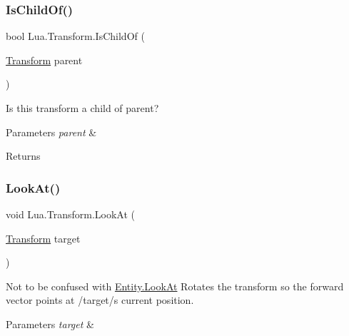 \subsubsection{\texorpdfstring{IsChildOf()}{IsChildOf()}}
{\footnotesize\ttfamily bool Lua.\+Transform.\+Is\+Child\+Of (\begin{DoxyParamCaption}\item[{\mbox{\hyperlink{class_lua_1_1_transform}{Transform}}}]{parent }\end{DoxyParamCaption})}



Is this transform a child of parent? 


\begin{DoxyParams}{Parameters}
{\em parent} & \\
\hline
\end{DoxyParams}
\begin{DoxyReturn}{Returns}

\end{DoxyReturn}
\mbox{\label{class_lua_1_1_transform_a1e722de9c3eacff82477ab7684a67553}} 
\subsubsection{\texorpdfstring{LookAt()}{LookAt()}\hspace{0.1cm}{\footnotesize\ttfamily [1/4]}}
{\footnotesize\ttfamily void Lua.\+Transform.\+Look\+At (\begin{DoxyParamCaption}\item[{\mbox{\hyperlink{class_lua_1_1_transform}{Transform}}}]{target }\end{DoxyParamCaption})}



Not to be confused with \mbox{\hyperlink{class_lua_1_1_entity_a29cdb052c5422873a708c8080039cb4b}{Entity.\+Look\+At}} Rotates the transform so the forward vector points at /target/\textquotesingle{}s current position. 


\begin{DoxyParams}{Parameters}
{\em target} & \\
\hline
\end{DoxyParams}
\mbox{\label{class_lua_1_1_transform_acab4e79308fc20ffa13f6048b7cb3184}} 
